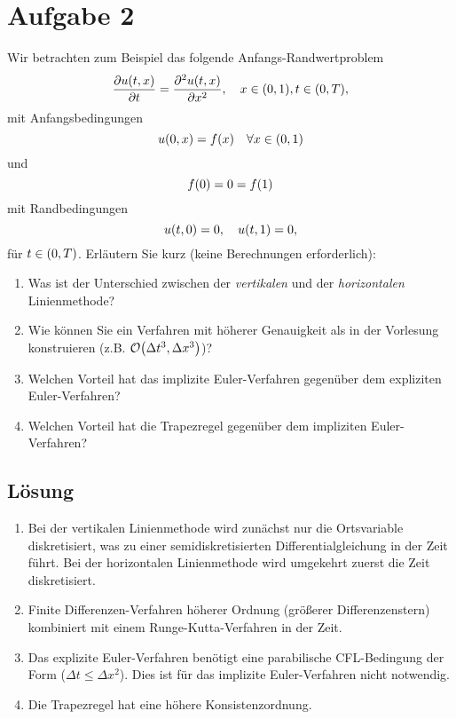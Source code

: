 \documentclass{exercise}
\begin{document}
    \section*{Aufgabe 2}
    
    \begin{problem}
        Wir betrachten zum Beispiel das folgende Anfangs-Randwertproblem
        \[
            \frac{\partial u\parentheses*{t, x}}{\partial t} = \frac{\partial^2 u\parentheses*{t, x}}{\partial x^2}, \quad x \in \parentheses*{0, 1}, t \in \parentheses*{0, T},
        \]
        mit Anfangsbedingungen
        \[  
            u\parentheses*{0, x} = f\parentheses*{x} \quad \forall x \in \parentheses*{0, 1}
        \]
        und
        \[
            f\parentheses*{0} = 0 = f\parentheses*{1}
        \]
        mit Randbedingungen
        \[
            u\parentheses*{t, 0} = 0, \quad u\parentheses*{t, 1} = 0,
        \]
        für \(t \in \parentheses*{0, T}\).
        Erläutern Sie kurz (keine Berechnungen erforderlich):
        \begin{enumerate}
            \item Was ist der Unterschied zwischen der \emph{vertikalen} und der \emph{horizontalen} Linienmethode?
            \item Wie können Sie ein Verfahren mit höherer Genauigkeit als in der Vorlesung konstruieren (z.B. \(\mathcal{O}\parentheses*{\Delta t^3, \Delta x^3}\))?
            \item Welchen Vorteil hat das implizite Euler-Verfahren gegenüber dem expliziten Euler-Verfahren?
            \item Welchen Vorteil hat die Trapezregel gegenüber dem impliziten Euler-Verfahren?
        \end{enumerate}
    \end{problem}
    
    \subsection*{Lösung}
    \begin{enumerate}
        \item Bei der vertikalen Linienmethode wird zunächst nur die Ortsvariable diskretisiert, was zu einer semidiskretisierten Differentialgleichung in der Zeit führt.
        Bei der horizontalen Linienmethode wird umgekehrt zuerst die Zeit diskretisiert.
        \item Finite Differenzen-Verfahren höherer Ordnung (größerer Differenzenstern) kombiniert mit einem Runge-Kutta-Verfahren in der Zeit.
        \item Das explizite Euler-Verfahren benötigt eine parabilische CFL-Bedingung der Form (\(\Delta t \le \Delta x^2\)).
        Dies ist für das implizite Euler-Verfahren nicht notwendig.
        \item Die Trapezregel hat eine höhere Konsistenzordnung.
    \end{enumerate}
\end{document}
